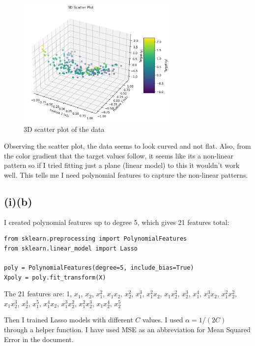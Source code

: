 \documentclass[11pt,a4paper]{article}
\begin{document}
\begin{figure}[H]
\centering
\includegraphics[width=0.7\textwidth]{figures/02_3d_scatter_plot.png}
\caption{3D scatter plot of the data}
\label{fig:3d_scatter}
\end{figure}

Observing the scatter plot, the data seems to look curved and not flat. Also, from the color gradient that the target values follow, it seems like its a non-linear pattern so if I tried fitting just a plane (linear model) to this it wouldn't work well. This tells me I need polynomial features to capture the non-linear patterns.

\subsection*{(i)(b)}

I created polynomial features up to degree 5, which gives 21 features total:

\begin{lstlisting}
from sklearn.preprocessing import PolynomialFeatures
from sklearn.linear_model import Lasso

poly = PolynomialFeatures(degree=5, include_bias=True)
Xpoly = poly.fit_transform(X)
\end{lstlisting}

The 21 features are: 1, $x_1$, $x_2$, $x_1^2$, $x_1x_2$, $x_2^2$, $x_1^3$, $x_1^2x_2$, $x_1x_2^2$, $x_2^3$, $x_1^4$, $x_1^3x_2$, $x_1^2x_2^2$, $x_1x_2^3$, $x_2^4$, $x_1^5$, $x_1^4x_2$, $x_1^3x_2^2$, $x_1^2x_2^3$, $x_1x_2^4$, $x_2^5$

Then I trained Lasso models with different $C$ values. I used $\alpha = 1/(2C)$ through a helper function. I have used MSE as an abbreviation for Mean Squared Error in the document.
\end{document}
